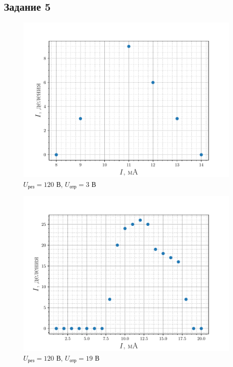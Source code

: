 \subsection{Задание 5}
\begin{figure}[H]
		\centering
		\includegraphics[height=0.4\textheight]{fig/res120Vref3V.pdf}
		\caption{$U_{\text{рез}}=120$ В, $U_{\text{отр}}=3$ В}
		\label{fig:res120Vref3V}
\end{figure}
\begin{figure}[H]
		\centering
		\includegraphics[height=0.4\textheight]{fig/res120Vref19V.pdf}
		\caption{$U_{\text{рез}}=120$ В, $U_{\text{отр}}=19$ В}
		\label{fig:res120Vref19V}
\end{figure}
